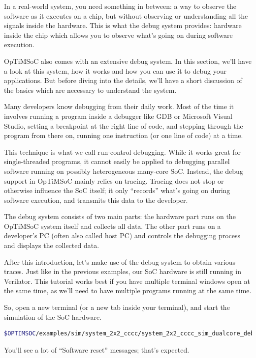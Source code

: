 In a real-world system, you need something in between: a way to observe the software as it executes on a chip, but without observing or understanding all the signals inside the hardware.
This is what the debug system provides: hardware inside the chip which allows you to observe what's going on during software execution.

OpTiMSoC also comes with an extensive debug system. In this section, we'll have
a look at this system, how it works and how you can use it to debug your
applications. But before diving into the details, we'll have a short discussion
of the basics which are necessary to understand the system.

Many developers know debugging from their daily work. Most of the time it
involves running a program inside a debugger like GDB or Microsoft Visual
Studio, setting a breakpoint at the right line of code, and stepping through the
program from there on, running one instruction (or one line of code) at a time.

This technique is what we call run-control debugging. While it works great for
single-threaded programs, it cannot easily be applied to debugging parallel
software running on possibly heterogeneous many-core SoC.
Instead, the debug support in OpTiMSoC mainly relies on tracing.
Tracing does not stop or otherwise influence the SoC itself; it only ``records'' what's going on during software execution, and transmits this data to the developer.

The debug system consists of two main parts: the hardware part runs on the
OpTiMSoC system itself and collects all data. The other part runs on a
developer's PC (often also called host PC) and controls the debugging process
and displays the collected data.

\medskip

After this introduction, let's make use of the debug system to obtain various traces.
Just like in the previous examples, our SoC hardware is still running in Verilator.
This tutorial works best if you have multiple terminal windows open at the same time, as we'll need to have multiple programs running at the same time.

So, open a new terminal (or a new tab inside your terminal), and start the simulation of the SoC hardware.
\begin{lstlisting}[language=sh]
$OPTIMSOC/examples/sim/system_2x2_cccc/system_2x2_cccc_sim_dualcore_debug
\end{lstlisting}

You'll see a lot of ``Software reset'' messages; that's expected.

